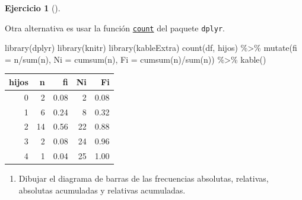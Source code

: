 \documentclass[
  a4paper,
]{scrreport}
\newenvironment{Shaded}{\begin{snugshade}}{\end{snugshade}}
\newcommand{\AttributeTok}[1]{\textcolor[rgb]{0.40,0.45,0.13}{#1}}
\newcommand{\FunctionTok}[1]{\textcolor[rgb]{0.28,0.35,0.67}{#1}}
\newcommand{\NormalTok}[1]{\textcolor[rgb]{0.00,0.23,0.31}{#1}}
\newcommand{\SpecialCharTok}[1]{\textcolor[rgb]{0.37,0.37,0.37}{#1}}
\providecommand{\tightlist}{%
  \setlength{\itemsep}{0pt}\setlength{\parskip}{0pt}}\usepackage{longtable,booktabs,array}
\theoremstyle{definition}
\newtheorem{exercise}{Ejercicio}[chapter]
\theoremstyle{remark}
\begin{document}
\begin{exercise}[]
\begin{tcolorbox}[enhanced jigsaw, coltitle=black, breakable, bottomtitle=1mm, colbacktitle=quarto-callout-tip-color!10!white, rightrule=.15mm, opacityback=0, opacitybacktitle=0.6, left=2mm, colframe=quarto-callout-tip-color-frame, title=\textcolor{quarto-callout-tip-color}{\faLightbulb}\hspace{0.5em}{Solución 2}, toprule=.15mm, toptitle=1mm, arc=.35mm, colback=white, titlerule=0mm, bottomrule=.15mm, leftrule=.75mm]

Otra alternativa es usar la función
\href{https://aprendeconalf.es/manual-r/06-preprocesamiento.html\#conteo-del-n\%C3\%BAmero-de-observaciones}{\texttt{count}}
del paquete \texttt{dplyr}.

\begin{Shaded}
\begin{Highlighting}[]
\FunctionTok{library}\NormalTok{(dplyr)}
\FunctionTok{library}\NormalTok{(knitr)}
\FunctionTok{library}\NormalTok{(kableExtra)}
\FunctionTok{count}\NormalTok{(df, hijos) }\SpecialCharTok{\%\textgreater{}\%} 
    \FunctionTok{mutate}\NormalTok{(}\AttributeTok{fi =}\NormalTok{ n}\SpecialCharTok{/}\FunctionTok{sum}\NormalTok{(n), }\AttributeTok{Ni =} \FunctionTok{cumsum}\NormalTok{(n), }\AttributeTok{Fi =} \FunctionTok{cumsum}\NormalTok{(n)}\SpecialCharTok{/}\FunctionTok{sum}\NormalTok{(n)) }\SpecialCharTok{\%\textgreater{}\%}
    \FunctionTok{kable}\NormalTok{()}
\end{Highlighting}
\end{Shaded}

\begin{tabular}{r|r|r|r|r}
\hline
hijos & n & fi & Ni & Fi\\
\hline
0 & 2 & 0.08 & 2 & 0.08\\
\hline
1 & 6 & 0.24 & 8 & 0.32\\
\hline
2 & 14 & 0.56 & 22 & 0.88\\
\hline
3 & 2 & 0.08 & 24 & 0.96\\
\hline
4 & 1 & 0.04 & 25 & 1.00\\
\hline
\end{tabular}

\end{tcolorbox}

\begin{enumerate}
\def\labelenumi{\alph{enumi}.}
\setcounter{enumi}{2}
\tightlist
\item
  Dibujar el diagrama de barras de las frecuencias absolutas, relativas,
  absolutas acumuladas y relativas acumuladas.
\end{enumerate}


\end{exercise}
\end{document}
